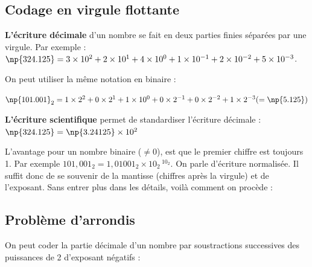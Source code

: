 \subsection{Codage en virgule flottante}

{\bfseries L'écriture décimale} d'un nombre se fait en deux parties finies séparées par une virgule. Par exemple : $\np{324.125} = 3\times 10^2 + 2\times 10^1 + 4\times 10^0 + 1\times 10^{-1} + 2\times 10^{-2} + 5\times 10^{-3}$.

On peut utiliser la même notation en binaire : 

$\np{101.001}_2 = 1\times 2^2 + 0\times 2^1 + 1\times 10^0  + 0\times 2^{-1} + 0\times 2^{-2} + 1\times 2^{-3} (= \np{5.125})$

\medskip

{\bfseries L'écriture scientifique} permet de standardiser l'écriture décimale : $\np{324.125} = \np{3.24125}\times 10^2$

L'avantage pour un nombre binaire ($\neq0$), est que le premier chiffre est toujours 1. Par exemple $101,001_2 = 1,01001_2 \times 10_2\,^{10_2}$. On parle d'écriture normalisée. Il suffit donc de se souvenir de la mantisse (chiffres après la virgule) et de l'exposant. Sans entrer plus dans les détails, voilà comment on procède :


\subsection{Problème d'arrondis}

On peut coder la partie décimale d'un nombre par soustractions successives des puissances de 2 d'exposant négatifs :

